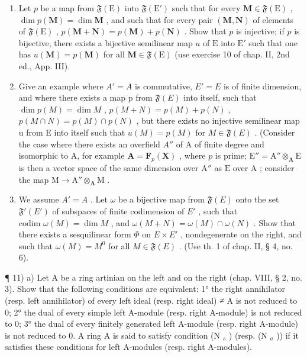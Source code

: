 \begin{enumerate}
\def\labelenumi{\alph{enumi})}
\item
  Let \(p\) be a map from \(\mathfrak{F}(\mathrm{E})\) into \(\mathfrak{F}(\mathrm{E}')\) such that for every \(\mathbf{M} \in \mathfrak{F}(\mathrm{E})\) , \(\dim p(\mathbf{M}) = \dim \mathbf{M}\) , and such that for every pair \((\mathbf{M}, \mathbf{N})\) of elements of \(\mathfrak{F}(\mathrm{E})\) , \(p(\mathbf{M} + \mathbf{N}) = p(\mathbf{M}) + p(\mathbf{N})\) . Show that \(p\) is injective; if \(p\) is bijective, there exists a bijective semilinear map \(u\) of \(\mathrm{E}\) into \(\mathrm{E}'\) such that one has \(u(\mathbf{M}) = p(\mathbf{M})\) for all \(\mathbf{M} \in \mathfrak{F}(\mathrm{E})\) (use exercise 10 of chap. II, 2nd ed., App. III).
\item
  Give an example where \(A' = A\) is commutative, \(E' = E\) is of finite dimension, and where there exists a map p from \(\mathfrak{F}(E)\) into itself, such that \(\dim p(M) = \dim M\) , \(p(M + N) = p(M) + p(N)\) , \(p(M \cap N) = p(M) \cap p(N)\) , but there exists no injective semilinear map u from E into itself such that \(u(M) = p(M)\) for \(M \in \mathfrak{F}(E)\) . (Consider the case where there exists an overfield \(A''\) of A of finite degree and isomorphic to A, for example \(\mathbf{A} = \mathbf{F}_{p}(\mathbf{X})\) , where \(p\) is prime; \(\mathrm{E}'' = \mathrm{A}'' \otimes_{\mathbf{A}} \mathrm{E}\) is then a vector space of the same dimension over \(\mathrm{A}''\) as \(\mathrm{E}\) over \(\mathrm{A}\) ; consider the map \(\mathrm{M} \to \mathrm{A}'' \otimes_{\mathbf{A}} \mathrm{M}\) .
\item
  We assume \(A' = A\) . Let \(\omega\) be a bijective map from \(\mathfrak{F}(E)\) onto the set \(\mathfrak{F}'(E')\) of subspaces of finite codimension of \(E'\) , such that \(\text{codim } \omega(M) = \dim M\) , and \(\omega(M + N) = \omega(M) \cap \omega(N)\) . Show that there exists a sesquilinear form \(\Phi\) on \(E \times E'\) , nondegenerate on the right, and such that \(\omega(M) = M^0\) for all \(M \in \mathfrak{F}(E)\) . (Use th. 1 of chap. II, § 4, no. 6).
\end{enumerate}

¶ 11) a) Let A be a ring artinian on the left and on the right (chap. VIII, § 2, no. 3). Show that the following conditions are equivalent: 1° the right annihilator (resp. left annihilator) of every left ideal (resp. right ideal) ≠ A is not reduced to 0; 2° the dual of every simple left A-module (resp. right A-module) is not reduced to 0; 3° the dual of every finitely generated left A-module (resp. right A-module) is not reduced to 0. A ring A is said to satisfy condition (N \(_{s}\) ) (resp. (N \(_{a}\) )) if it satisfies these conditions for left A-modules (resp. right A-modules).

